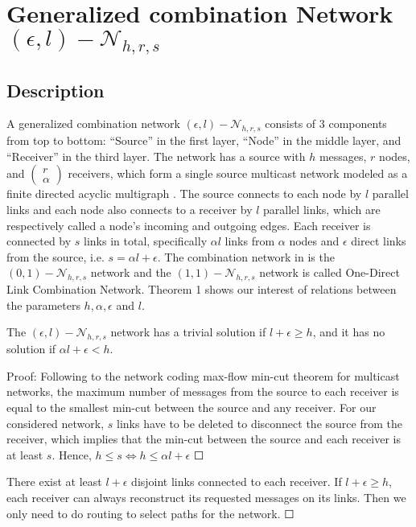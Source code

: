 \chapter{Generalized combination Network $(\epsilon,l)-\mathcal{N}_{h,r,s}$} \label{chap:general_network}

\section{Description \label{sec:Description_GCN}}

A generalized combination network $(\epsilon,l)-\mathcal{N}_{h,r,s}$
consists of 3 components from top to bottom: ``Source'' in the first
layer, ``Node'' in the middle layer, and ``Receiver'' in the third
layer. The network has a source with $h$ messages, $r$ nodes, and
$\left(\begin{array}{c}
r\\
\alpha
\end{array}\right)$ receivers, which form a single source multicast network modeled as
a finite directed acyclic multigraph \cite{Li:2003}. The source connects
to each node by $l$ parallel links and each node also connects to
a receiver by $l$ parallel links, which are respectively called a
node's incoming and outgoing edges. Each receiver is connected by
$s$ links in total, specifically $\alpha l$ links from $\alpha$
nodes and $\epsilon$ direct links from the source, i.e. $s=\alpha l+\epsilon$.
The combination network in \cite{Riis:2006} is the $(0,1)-\mathcal{N}_{h,r,s}$
network and the $(1,1)-\mathcal{N}_{h,r,s}$ network is called One-Direct
Link Combination Network. Theorem 1 shows our interest of relations
between the parameters $h,\alpha,\epsilon$ and $l$.
\begin{thm}
\label{nw_parameters}The $(\epsilon,l)-\mathcal{N}_{h,r,s}$ network
has a trivial solution if $l+\epsilon\geq h$, and it has no solution
if $\alpha l+\epsilon<h$. 

Proof: Following to the network coding max-flow min-cut theorem for
multicast networks, the maximum number of messages from the source
to each receiver is equal to the smallest min-cut between the source
and any receiver. For our considered network, $s$ links have to be
deleted to disconnect the source from the receiver, which implies
that the min-cut between the source and each receiver is at least
$s$. Hence, $h\leq s\Leftrightarrow h\leq\alpha l+\epsilon$ $\Square$

There exist at least $l+\epsilon$ disjoint links connected to each
receiver. If $l+\epsilon\geq h$, each receiver can always reconstruct
its requested messages on its links. Then we only need to do routing
to select paths for the network. $\Square$
\end{thm}
